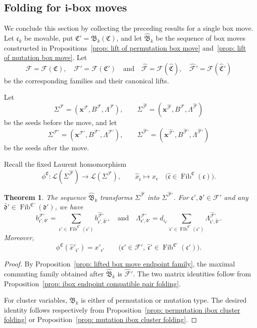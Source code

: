 \documentclass[12pt, leqno]{amsart}
\numberwithin{equation}{section}
\theoremstyle{plain}
\newtheorem{theorem}[lemma]{Theorem}
\theoremstyle{definition}
\newcommand{\Fib}{\operatorname{Fib}}
\newcommand{\hx}{\widehat{x}}
\newcommand{\frakB}{\mathfrak{B}}
\newcommand{\frakC}{\mathfrak{C}}
\newcommand{\frakc}{\mathfrak{c}}
\newcommand{\frakd}{\mathfrak{d}}
\newcommand{\hfrakC}{\widehat{\frakC}}
\newcommand{\hfrakc}{\widehat{\frakc}}
\newcommand{\hfrakd}{\widehat{\frakd}}
\newcommand{\bfi}{\mathbf{i}}
\newcommand{\bfx}{\mathbf{x}}
\newcommand{\calF}{\mathcal{F}}
\newcommand{\calL}{\mathcal{L}}
\newcommand{\hcalF}{{\widehat{\calF}}}
\newcommand{\hfrakB}{\widehat{\frakB}}
\newcommand{\qtq}[1][{and}]{\quad\text{{#1}}\quad}
\begin{document}
\subsection{Folding for $\bfi$-box moves}

We conclude this section by collecting the preceding results for a
single box move.  
Let $\frakc_k$ be movable, put $\frakC'=\frakB_k(\frakC)$, and let 
$\hfrakB_k$
 be the sequence of box moves constructed in{}
Propositions~\ref{prop: lift of permutation box move}
and~\ref{prop: lift of mutation box move}.  Let \[
\calF=\calF(\frakC), \quad \calF'=\calF(\frakC') \qtq  \hcalF=\calF(\hfrakC), \quad \hcalF'=\calF(\hfrakC')
\]
be the corresponding families and their canonical lifts. \par
Let
\[
\Sigma^\calF = (\bfx^\calF,B^\calF,\Lambda^\calF),
\qquad
\Sigma^\hcalF = (\bfx^\hcalF,B^\hcalF,\Lambda^\hcalF)
\]
 be the seeds before the move, and let
\[
\Sigma^{\calF'} = (\bfx^{\calF'},B^{\calF'},\Lambda^{\calF'}),
\qquad
\Sigma^{\hcalF'} = (\bfx^{\hcalF'},B^{\hcalF'},\Lambda^{\hcalF'})
\]
 be the seeds after the move.

Recall  the fixed Laurent homomorphism
\[
\phi^\frakC: \calL(\Sigma^\hcalF) \longrightarrow \calL(\Sigma^\calF),
\qquad
\hx_{\hfrakc}\longmapsto x_\frakc \quad \bigl( \hfrakc\in\Fib^{\frakC}(\frakc) \bigr).
\]

\begin{theorem}\label{thm: ibox endpoint folding}
 The sequence $\hfrakB_k$ transforms
$\Sigma^\hcalF$ into $\Sigma^{\hcalF'}$.{}
 For
$\frakc',\frakd'\in\calF'$ and any{}
$\hfrakd'\in\Fib^{\frakC'}(\frakd')$, we have
\[
b^{\calF'}_{\frakc',\frakd'} = \sum_{\hfrakc'\in\Fib^{\frakC'}(\frakc')} b^{\hcalF'}_{\hfrakc',\hfrakd'},
\qtq
\Lambda^{\calF'}_{\frakc',\frakd'} = d_{i_{\frakc'}} \sum_{\hfrakc'\in\Fib^{\frakC'}(\frakc')} \Lambda^{\hcalF'}_{\hfrakc',\hfrakd'}.
\]
Moreover,
\[
\phi^\frakC(\hx'_{\hfrakc'}) = x'_{\frakc'}
\qquad
\bigl(\frakc'\in\calF',\ \hfrakc'\in\Fib^{\frakC'}(\frakc') \bigr).
\]
{} \end{theorem}

\begin{proof}
By Proposition~\ref{prop: lifted box move endpoint family}, the 
maximal commuting family obtained after $\hfrakB_k$ is $\hcalF'$.
 The two matrix identities follow from{} Proposition~\ref{prop: ibox endpoint compatible pair folding}.

For cluster variables, $\frakB_k$ is either of permutation or
mutation type. The desired identity follows respectively from
Proposition~\ref{prop: permutation ibox cluster folding} or
Proposition~\ref{prop: mutation ibox cluster folding}.
\end{proof}
\end{document}
